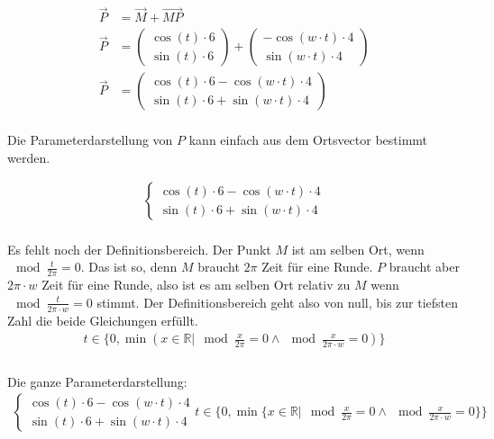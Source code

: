 \documentclass[12pt, a4paper, twoside]{article}
\begin{document}
\begin{align*}
  \overrightarrow{P} & = \overrightarrow{M} + \overrightarrow{MP}               \\
  \overrightarrow{P} & = \begin{pmatrix}
    \cos(t) \cdot 6
    \\
    \sin(t) \cdot 6
  \end{pmatrix} + \begin{pmatrix}
    -\cos(w\cdot t) \cdot 4
    \\
    \sin(w\cdot t) \cdot 4
  \end{pmatrix} \\
  \overrightarrow{P} & = \begin{pmatrix}
    \cos(t)\cdot 6 - \cos(w\cdot t)\cdot 4
    \\
    \sin(t)\cdot 6 + \sin(w\cdot t)\cdot 4
  \end{pmatrix}
\end{align*}
\\

Die Parameterdarstellung von $P$ kann einfach aus dem Ortsvector bestimmt werden.

\begin{align*}
  \begin{cases}
    \cos(t)\cdot 6 - \cos(w\cdot t)\cdot 4
    \\
    \sin(t)\cdot 6 + \sin(w\cdot t)\cdot 4
  \end{cases}
\end{align*}
\\

Es fehlt noch der Definitionsbereich.
Der Punkt $M$ ist am selben Ort, wenn $\mod{\frac{t}{2\pi}} = 0$.
Das ist so, denn $M$ braucht $2\pi$ Zeit für eine Runde.
$P$ braucht aber $2\pi \cdot w$ Zeit für eine Runde, also ist es am selben Ort relativ zu $M$ wenn $\mod{\frac{t}{2\pi \cdot w}} = 0$ stimmt.
Der Definitionsbereich geht also von null, bis zur tiefsten Zahl die beide Gleichungen erfüllt.\\
\begin{align*}
  t \in \{0, \min(x\in\mathbb{R} | \mod{\frac{x}{2\pi}} = 0 \land\mod{\frac{x}{2\pi \cdot w}} = 0)\} \\
\end{align*}
\\

Die ganze Parameterdarstellung:
\begin{align*}
  \begin{cases}
    \cos(t)\cdot 6 - \cos(w\cdot t)\cdot 4
    \\
    \sin(t)\cdot 6 + \sin(w\cdot t)\cdot 4
  \end{cases}t \in \{0, \min\{x\in\mathbb{R} | \mod{\frac{x}{2\pi}} = 0 \land\mod{\frac{x}{2\pi \cdot w}} = 0\}\} \\
\end{align*}
\\
\end{document}
